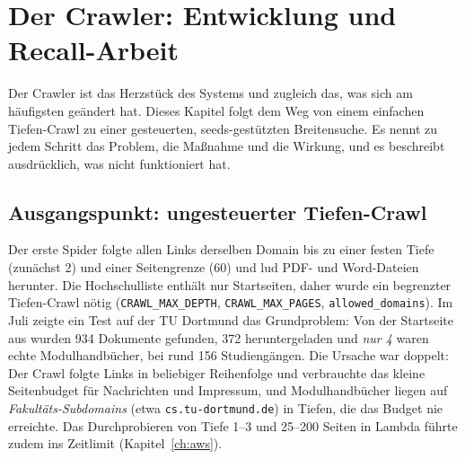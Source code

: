 \chapter{Der Crawler: Entwicklung und Recall-Arbeit}\label{ch:crawler}

Der Crawler ist das Herzstück des Systems und zugleich das, was sich am häufigsten geändert hat. Dieses Kapitel folgt dem Weg von einem einfachen Tiefen-Crawl zu einer gesteuerten, seeds-gestützten Breitensuche. Es nennt zu jedem Schritt das Problem, die Maßnahme und die Wirkung, und es beschreibt ausdrücklich, was nicht funktioniert hat.

\section{Ausgangspunkt: ungesteuerter Tiefen-Crawl}
Der erste Spider folgte allen Links derselben Domain bis zu einer festen Tiefe (zunächst 2) und einer Seitengrenze (60) und lud PDF- und Word-Dateien herunter. Die Hochschulliste enthält nur Startseiten, daher wurde ein begrenzter Tiefen-Crawl nötig (\texttt{CRAWL\_MAX\_DEPTH}, \texttt{CRAWL\_MAX\_PAGES}, \texttt{allowed\_domains}). Im Juli zeigte ein Test auf der TU Dortmund das Grundproblem: Von der Startseite aus wurden 934 Dokumente gefunden, 372 heruntergeladen und \emph{nur 4} waren echte Modulhandbücher, bei rund 156 Studiengängen. Die Ursache war doppelt: Der Crawl folgte Links in beliebiger Reihenfolge und verbrauchte das kleine Seitenbudget für Nachrichten und Impressum, und Modulhandbücher liegen auf \emph{Fakultäts-Subdomains} (etwa \texttt{cs.tu-dortmund.de}) in Tiefen, die das Budget nie erreichte. Das Durchprobieren von Tiefe 1--3 und 25--200 Seiten in Lambda führte zudem ins Zeitlimit (Kapitel~\ref{ch:aws}).

